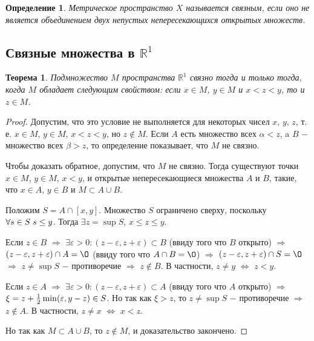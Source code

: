 \documentclass{article}
\newtheorem{theorem}{Теорема}[section]
\newtheorem{definition}{Определение}[section]
\begin{document}
\begin{definition}
Метрическое пространство \(X\) называется связным, если оно не является объединением двух непустых непересекающихся открытых множеств.
\end{definition}

\subsection{Связные множества в \(\mathbb{R}^1\)}

\begin{theorem}
Подмножество \(M\) пространства \(\mathbb{R}^1\) связно тогда и только тогда, когда \(M\) обладает следующим свойством: если \(x \in M\), \(y \in M\) и \(x < z < y\), то и \(z \in M\).
\end{theorem}

\begin{proof}
Допустим, что это условие не выполняется для некоторых чисел \(x\), \(y\), \(z\), т. е. \(x \in M\), \(y \in M\), \(x < z < y\), но \(z \notin M\). Если \(A\) есть множество всех \(\alpha < z\), a \(B\) \(-\) множество всех \(\beta > z\), то определение показывает, что \(M\) не связно.

Чтобы доказать обратное, допустим, что \(M\) не связно. Тогда существуют точки \(x \in M\), \(y \in M\), \(x < y\), и открытые непересекающиеся множества \(A\) и \(B\), такие, что \(x \in A\), \(y \in B\) и \(M \subset A \cup B\).

Положим \(S = A \cap [x, y]\). Множество \(S\) ограничено сверху, поскольку \(\forall s \in S \hspace{1mm} s \leq y\). Тогда \(\exists z = \sup S\), \(x \leq z \leq y\).

Если \(z \in B\) \(\Rightarrow\) \(\exists \varepsilon > 0 : (z - \varepsilon, z + \varepsilon) \subset B\) (ввиду того что \(B\) открыто) \(\Rightarrow\) \((z - \varepsilon, z + \varepsilon) \cap A = \O\) (ввиду того что \(A \cap B = \O\)) \(\Rightarrow\) \((z - \varepsilon, z + \varepsilon) \cap S = \O\) \(\Rightarrow\) \(z \neq \sup S\) \(-\) противоречие \(\Rightarrow\) \(z \notin B\). В частности, \(z \neq y\) \(\Leftrightarrow\) \(z < y\).

Если \(z \in A\) \(\Rightarrow\) \(\exists \varepsilon > 0 : (z - \varepsilon, z + \varepsilon) \subset A\) (ввиду того что \(A\) открыто) \(\Rightarrow\) \(\xi = z + {1 \over 2}\min(\varepsilon, y - z) \in S\). Но так как \(\xi > z\), то \(z \neq \sup S\) \(-\) противоречие \(\Rightarrow\) \(z \notin A\). В частности, \(z \neq x\) \(\Leftrightarrow\) \(x < z\).

Но так как \(M \subset A \cup B\), то \(z \notin M\), и доказательство закончено.
\end{proof}
\end{document}
